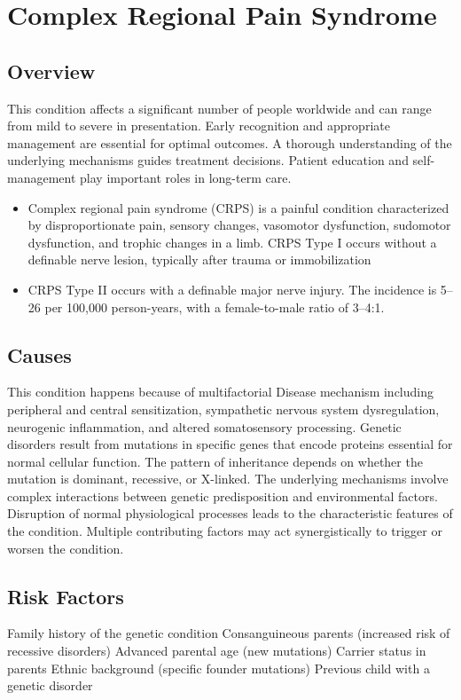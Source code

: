 \chapter{Complex Regional Pain Syndrome}
\label{sec:Complex Regional Pain Syndrome}

\section{Overview}
This condition affects a significant number of people worldwide and can range from mild to severe in presentation. Early recognition and appropriate management are essential for optimal outcomes. A thorough understanding of the underlying mechanisms guides treatment decisions. Patient education and self-management play important roles in long-term care.

\begin{itemize}[noitemsep]
  \item Complex regional pain syndrome (CRPS) is a painful condition characterized by disproportionate pain, sensory changes, vasomotor dysfunction, sudomotor dysfunction, and trophic changes in a limb. CRPS Type I occurs without a definable nerve lesion, typically after trauma or immobilization
  \item CRPS Type II occurs with a definable major nerve injury. The incidence is 5--26 per 100,000 person-years, with a female-to-male ratio of 3--4:1.
\end{itemize}
\section{Causes}
This condition happens because of multifactorial Disease mechanism including peripheral and central sensitization, sympathetic nervous system dysregulation, neurogenic inflammation, and altered somatosensory processing. Genetic disorders result from mutations in specific genes that encode proteins essential for normal cellular function. The pattern of inheritance depends on whether the mutation is dominant, recessive, or X-linked. The underlying mechanisms involve complex interactions between genetic predisposition and environmental factors. Disruption of normal physiological processes leads to the characteristic features of the condition. Multiple contributing factors may act synergistically to trigger or worsen the condition.
\section{Risk Factors}
Family history of the genetic condition Consanguineous parents (increased risk of recessive disorders) Advanced parental age (new mutations) Carrier status in parents Ethnic background (specific founder mutations) Previous child with a genetic disorder

